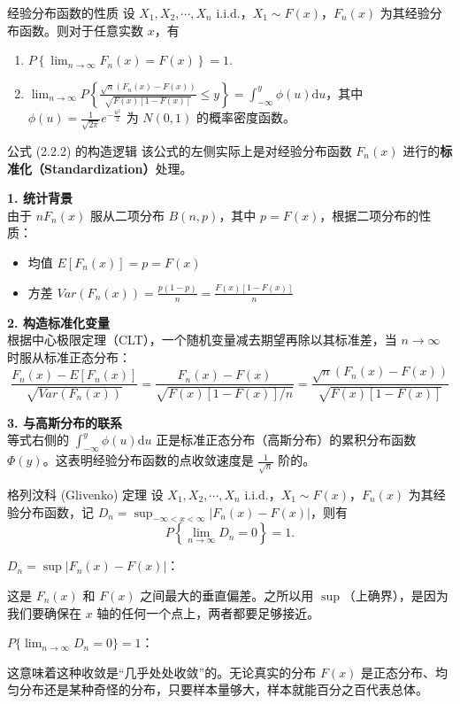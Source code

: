 \begin{theorem}{经验分布函数的性质}
    设 $X_1, X_2, \cdots, X_n$ i.i.d.，$X_1 \sim F(x)$，$F_n(x)$ 为其经验分布函数。则对于任意实数 $x$，有
    \begin{enumerate}
        \item $P\left\{\lim_{n \to \infty} F_n(x) = F(x)\right\} = 1$.
        \item $\lim_{n \to \infty} P \left\{ \frac{\sqrt{n}(F_n(x) - F(x))}{\sqrt{F(x)[1 - F(x)]}} \leqslant y \right\} = \int_{-\infty}^{y} \phi(u) \mathrm{d}u$，其中 $\phi(u) = \frac{1}{\sqrt{2\pi}} e^{-\frac{u^2}{2}}$ 为 $N(0,1)$ 的概率密度函数。
    \end{enumerate}
\end{theorem}
\begin{note}{公式 (2.2.2) 的构造逻辑}
该公式的左侧实际上是对经验分布函数 $F_n(x)$ 进行的\textbf{标准化（Standardization）}处理。

\textbf{1. 统计背景} \\
由于 $n F_n(x)$ 服从二项分布 $B(n, p)$，其中 $p = F(x)$，根据二项分布的性质：
\begin{itemize}
    \item 均值 $E[F_n(x)] = p = F(x)$
    \item 方差 $Var(F_n(x)) = \frac{p(1-p)}{n} = \frac{F(x)[1-F(x)]}{n} $
\end{itemize}

\textbf{2. 构造标准化变量} \\
根据中心极限定理（CLT），一个随机变量减去期望再除以其标准差，当 $n \to \infty$ 时服从标准正态分布：
\[ \frac{F_n(x) - E[F_n(x)]}{\sqrt{Var(F_n(x))}} = \frac{F_n(x) - F(x)}{\sqrt{F(x)[1-F(x)] / n}} = \frac{\sqrt{n}(F_n(x) - F(x))}{\sqrt{F(x)[1 - F(x)]}} \]

\textbf{3. 与高斯分布的联系} \\
等式右侧的 $\int_{-\infty}^y \phi(u) \mathrm{d}u$ 正是标准正态分布（高斯分布）的累积分布函数 $\Phi(y)$。这表明经验分布函数的点收敛速度是 $\frac{1}{\sqrt{n}}$ 阶的。
\end{note}
\begin{theorem}{格列汶科 (Glivenko) 定理}
    设 $X_1, X_2, \cdots, X_n$ i.i.d.，$X_1 \sim F(x)$，$F_n(x)$ 为其经验分布函数，记 $D_n = \sup_{-\infty < x < \infty} |F_n(x) - F(x)|$，则有
    \[ P\left\{ \lim_{n \to \infty} D_n = 0 \right\} = 1. \]
\end{theorem}
\begin{note}
    $D_n = \sup |F_n(x) - F(x)|$：

这是 $F_n(x)$ 和 $F(x)$ 之间最大的垂直偏差。之所以用 $\sup$（上确界），是因为我们要确保在 $x$ 轴的任何一个点上，两者都要足够接近。

$P\{\lim_{n \to \infty} D_n = 0\} = 1$：

这意味着这种收敛是“几乎处处收敛”的。无论真实的分布 $F(x)$ 是正态分布、均匀分布还是某种奇怪的分布，只要样本量够大，样本就能百分之百代表总体。
\end{note}
